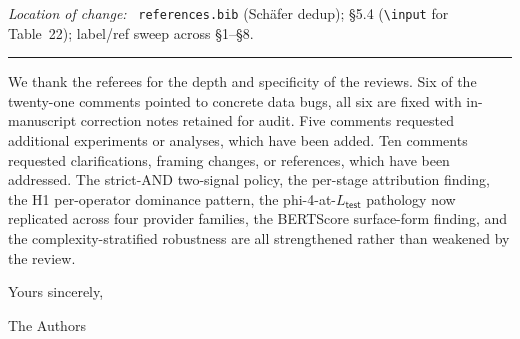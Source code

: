 \documentclass[11pt,a4paper]{article}
\newcommand{\loc}{\par\smallskip\noindent\textit{Location of change:}\ }
\begin{document}
\loc{} \texttt{references.bib} (Schäfer dedup); \S5.4 (\texttt{\textbackslash input} for Table~22); label/ref sweep across \S1--\S8.

\vspace{0.5em}

\begin{center}\rule{0.7\textwidth}{0.4pt}\end{center}

\vspace{0.3em}

We thank the referees for the depth and specificity of the reviews. Six of the twenty-one comments pointed to concrete data bugs, all six are fixed with in-manuscript correction notes retained for audit. Five comments requested additional experiments or analyses, which have been added. Ten comments requested clarifications, framing changes, or references, which have been addressed. The strict-AND two-signal policy, the per-stage attribution finding, the H1 per-operator dominance pattern, the phi-4-at-$L_{\textsf{test}}$ pathology now replicated across four provider families, the BERTScore surface-form finding, and the complexity-stratified robustness are all strengthened rather than weakened by the review.

\vspace{1.5em}

\noindent Yours sincerely,

\vspace{1.5em}

\noindent The Authors
\end{document}
